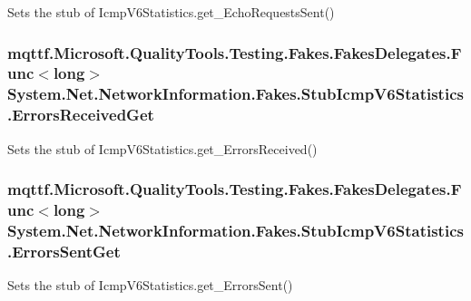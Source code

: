 Sets the stub of Icmp\-V6\-Statistics.\-get\-\_\-\-Echo\-Requests\-Sent()

\hypertarget{class_system_1_1_net_1_1_network_information_1_1_fakes_1_1_stub_icmp_v6_statistics_a6c9f7a697d5657f537428b871a53a4b3}{
\subsubsection[{Errors\-Received\-Get}]{\setlength{\rightskip}{0pt plus 5cm}mqttf.\-Microsoft.\-Quality\-Tools.\-Testing.\-Fakes.\-Fakes\-Delegates.\-Func$<$long$>$ System.\-Net.\-Network\-Information.\-Fakes.\-Stub\-Icmp\-V6\-Statistics.\-Errors\-Received\-Get}}\label{class_system_1_1_net_1_1_network_information_1_1_fakes_1_1_stub_icmp_v6_statistics_a6c9f7a697d5657f537428b871a53a4b3}


Sets the stub of Icmp\-V6\-Statistics.\-get\-\_\-\-Errors\-Received()

\hypertarget{class_system_1_1_net_1_1_network_information_1_1_fakes_1_1_stub_icmp_v6_statistics_acced50ac4f6a64a2242a5895465b44dd}{
\subsubsection[{Errors\-Sent\-Get}]{\setlength{\rightskip}{0pt plus 5cm}mqttf.\-Microsoft.\-Quality\-Tools.\-Testing.\-Fakes.\-Fakes\-Delegates.\-Func$<$long$>$ System.\-Net.\-Network\-Information.\-Fakes.\-Stub\-Icmp\-V6\-Statistics.\-Errors\-Sent\-Get}}\label{class_system_1_1_net_1_1_network_information_1_1_fakes_1_1_stub_icmp_v6_statistics_acced50ac4f6a64a2242a5895465b44dd}


Sets the stub of Icmp\-V6\-Statistics.\-get\-\_\-\-Errors\-Sent()

